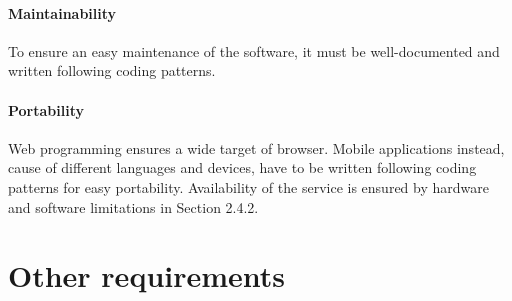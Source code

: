 \paragraph{Maintainability}
To ensure an easy maintenance of the software, it must be well-documented and written following coding patterns.
\paragraph{Portability}
Web programming ensures a wide target of browser. Mobile applications instead, cause of different languages and devices, have to be written following coding patterns for easy portability.
Availability of the service is ensured by hardware and software limitations in Section 2.4.2.
\section{Other requirements}
